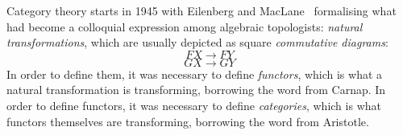 Category theory starts in 1945 with Eilenberg and MacLane~\cite{EilenbergMacLane45} formalising what had become a colloquial expression among algebraic topologists: \emph{natural transformations}, which are usually depicted as square \emph{commutative diagrams}:
$$FX \to FY$$
$$GX \to GY$$
In order to define them, it was necessary to define \emph{functors}, which is what a natural transformation is transforming, borrowing the word from Carnap.
In order to define functors, it was necessary to define \emph{categories}, which is what functors themselves are transforming, borrowing the word from Aristotle.
